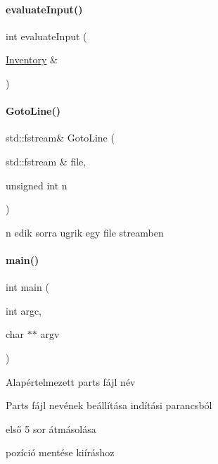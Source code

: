\mbox{\label{main_8h_a0e552edf6cae51d6a38ad105b2c29edb}} 
\paragraph{\texorpdfstring{evaluateInput()}{evaluateInput()}}
{\footnotesize\ttfamily int evaluate\+Input (\begin{DoxyParamCaption}\item[{\mbox{\hyperlink{class_inventory}{Inventory}} \&}]{ }\end{DoxyParamCaption})}

\mbox{\label{main_8h_aac067d016b66218b6d8e0578bc214ef0}} 
\paragraph{\texorpdfstring{GotoLine()}{GotoLine()}}
{\footnotesize\ttfamily std\+::fstream\& Goto\+Line (\begin{DoxyParamCaption}\item[{std\+::fstream \&}]{file,  }\item[{unsigned int}]{n }\end{DoxyParamCaption})\hspace{0.3cm}{\ttfamily [inline]}}



n edik sorra ugrik egy file streamben 

\mbox{\label{main_8h_a3c04138a5bfe5d72780bb7e82a18e627}} 
\paragraph{\texorpdfstring{main()}{main()}}
{\footnotesize\ttfamily int main (\begin{DoxyParamCaption}\item[{int}]{argc,  }\item[{char $\ast$$\ast$}]{argv }\end{DoxyParamCaption})}

Alapértelmezett parts fájl név

Parts fájl nevének beállítása indítási parancsból

első 5 sor átmásolása

pozíció mentése kiíráshoz \mbox{\label{main_8h_aa8348016f7273e63d47917126e8f9c69}} 
